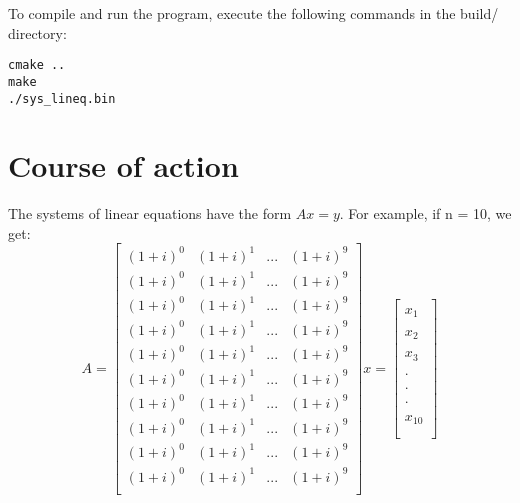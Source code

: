     To compile and run the program, execute the following commands in the build/ directory:
\begin{lstlisting}
cmake ..
make
./sys_lineq.bin
\end{lstlisting}


\newpage
\section{Course of action}
    The systems of linear equations have the form \(Ax = y\).
    For example, if n = 10, we get:
    \[
        A =
        \begin{bmatrix}
            (1+i)^{0} & (1+i)^{1} & ... & (1+i)^{9} \\
            (1+i)^{0} & (1+i)^{1} & ... & (1+i)^{9} \\
            (1+i)^{0} & (1+i)^{1} & ... & (1+i)^{9} \\
            (1+i)^{0} & (1+i)^{1} & ... & (1+i)^{9} \\
            (1+i)^{0} & (1+i)^{1} & ... & (1+i)^{9} \\
            (1+i)^{0} & (1+i)^{1} & ... & (1+i)^{9} \\
            (1+i)^{0} & (1+i)^{1} & ... & (1+i)^{9} \\
            (1+i)^{0} & (1+i)^{1} & ... & (1+i)^{9} \\
            (1+i)^{0} & (1+i)^{1} & ... & (1+i)^{9} \\
            (1+i)^{0} & (1+i)^{1} & ... & (1+i)^{9} \\
        \end{bmatrix}
        x =
        \begin{bmatrix}
            \\
            x_{1} \\\\
            x_{2} \\\\
            x_{3} \\\\
            . \\\\
            . \\\\
            . \\\\
            x_{10} \\\\

\end{bmatrix}\]
